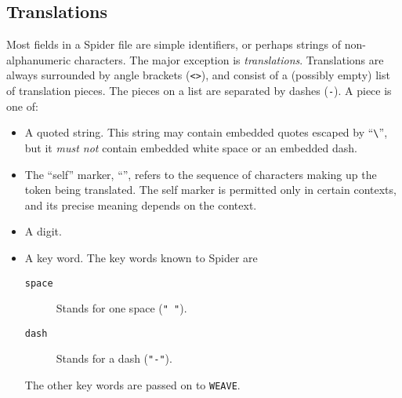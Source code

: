 \subsection{Translations}
Most fields in a {Spider} file are simple identifiers, or perhaps
strings of non-alphanumeric characters.
The major exception is {\em translations}.
Translations are always surrounded by angle brackets ({\tt <>}),
and consist of a (possibly empty) list of translation pieces.
The pieces on a list are separated by dashes ({\tt -}).
A piece is one of:
\begin{itemize}
\item A quoted string.
This string may contain embedded quotes escaped by ``\verb+\+'', but
it {\em must not} contain embedded white space or an embedded dash.
\item The ``self'' marker, ``{\tt *}'',
 refers to the sequence of characters making up the token being
translated.
The self marker is permitted only in certain contexts, and its precise
meaning depends on the context.
\item A digit.
\item A key word.
The key words known to {Spider} are
\begin{description} 
\item [\tt space] Stands for one space ({\tt "\ "}).
\item[\tt dash] Stands for a dash ({\tt "-"}).
\end{description}
The other key words are passed on to {\tt WEAVE}.


\end{itemize}
